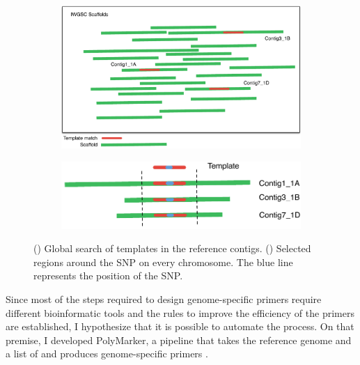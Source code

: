 \begin{figure}
\centering
\begin{subfigure}[b]{1\textwidth}
\caption{}
\includegraphics[width=1\textwidth]{PolyMarker/Figures/aln/scaffoldsSearch.pdf}
\label{fig:poly:globalSearch}
\end{subfigure}

\begin{subfigure}[b]{0.8\textwidth}
\caption{}
\includegraphics[width=1\textwidth]{PolyMarker/Figures/aln/scaffoldsFoundAround.pdf}
\label{fig:poly:globalAround} 
\end{subfigure}
\caption{() Global search of templates in the reference contigs. () Selected regions around the SNP on every chromosome. The blue line represents the position of the SNP.}
\end{figure}

Since most of the steps required to design genome-specific primers require different bioinformatic tools and the rules to improve the efficiency of the primers are established, I hypothesize that it is possible to automate the process. 
On that premise, I developed PolyMarker, a pipeline that takes the reference genome and a list of  and produces genome-specific primers \citep{Ramirez-Gonzalez2015a}. 

